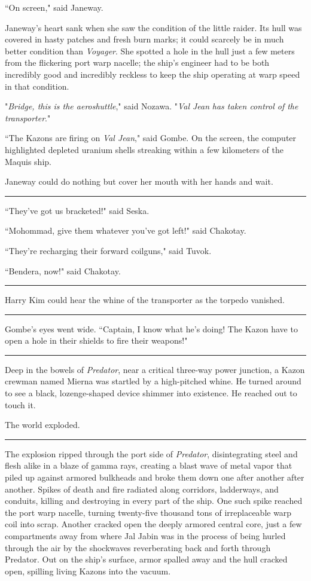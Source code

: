 \documentclass[twoside,letterpaper,12pt]{memoir}
\begin{document}
``On screen," said Janeway.

Janeway's heart sank when she saw the condition of the little raider. Its hull was covered in hasty patches and fresh burn marks; it could scarcely be in much better condition than \textit{Voyager}. She spotted a hole in the hull just a few meters from the flickering port warp nacelle; the ship's engineer had to be both incredibly good and incredibly reckless to keep the ship operating at warp speed in that condition.

"\textit{Bridge, this is the aeroshuttle}," said Nozawa. "\textit{Val Jean} \textit{has taken control of the transporter}."

``The Kazons are firing on \textit{Val Jean}," said Gombe. On the screen, the computer highlighted depleted uranium shells streaking within a few kilometers of the Maquis ship.

Janeway could do nothing but cover her mouth with her hands and wait.

\fancybreak{\rule{3cm}{0.4 pt}}
``They've got us bracketed!" said Seska.

``Mohommad, give them whatever you've got left!" said Chakotay.

``They're recharging their forward coilguns," said Tuvok.

``Bendera, now!" said Chakotay.

\fancybreak{\rule{3cm}{0.4 pt}}
Harry Kim could hear the whine of the transporter as the torpedo vanished.

\fancybreak{\rule{3cm}{0.4 pt}}
Gombe's eyes went wide. ``Captain, I know what he's doing! The Kazon have to open a hole in their shields to fire their weapons!"

\fancybreak{\rule{3cm}{0.4 pt}}
Deep in the bowels of \textit{Predator}, near a critical three-way power junction, a Kazon crewman named Mierna was startled by a high-pitched whine. He turned around to see a black, lozenge-shaped device shimmer into existence. He reached out to touch it.

The world exploded.

\fancybreak{\rule{3cm}{0.4 pt}}
The explosion ripped through the port side of \textit{Predator}, disintegrating steel and flesh alike in a blaze of gamma rays, creating a blast wave of metal vapor that piled up against armored bulkheads and broke them down one after another after another. Spikes of death and fire radiated along corridors, ladderways, and conduits, killing and destroying in every part of the ship. One such spike reached the port warp nacelle, turning twenty-five thousand tons of irreplaceable warp coil into scrap. Another cracked open the deeply armored central core, just a few compartments away from where Jal Jabin was in the process of being hurled through the air by the shockwaves reverberating back and forth through Predator. Out on the ship's surface, armor spalled away and the hull cracked open, spilling living Kazons into the vacuum.
\end{document}
